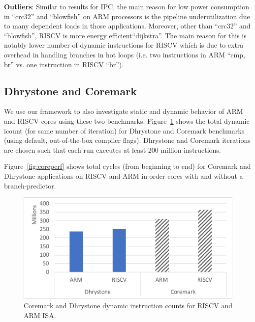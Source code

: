 \noindent \textbf{Outliers}: Similar to results for IPC, the main reason for low power consumption in ``crc32'' and ``blowfish'' on ARM processors is the pipeline underutilization due to many dependent loads in those applications. Moreover, other than ``crc32'' and ``blowfish'', RISCV is more energy efficient``dijkstra''. The main reason for this is notably lower number of dynamic instructions for RISCV which is due to extra overhead in handling branches in hot loops (i.e. two instructions in ARM ``cmp, br'' vs. one instruction in RISCV ``br'').  

\subsection{Dhrystone and Coremark}
We use our framework to also investigate static and dynamic behavior of ARM and RISCV cores using these two benchmarks. Figure~\ref{fig:coreinst} shows the total dynamic icount (for same number of iteration) for Dhrystone and Coremark benchmarks (using default, out-of-the-box compiler flags). Dhrystone and Coremark iterations are chosen such that each run executes at least 200 million instructions. 

Figure~\ref{fig:coreperf} shows total cycles (from beginning to end) for Coremark and Dhrystone applications on RISCV and ARM in-order cores with and without a branch-predictor. 

\begin{figure}[]
	\centering
	\includegraphics[width=1\columnwidth]{figures/core-inst.pdf}
	\caption{Coremark and Dhrystone dynamic instruction counts for RISCV and ARM ISA.}
	\label{fig:coreinst}
	\vspace{-1em}
\end{figure} 

